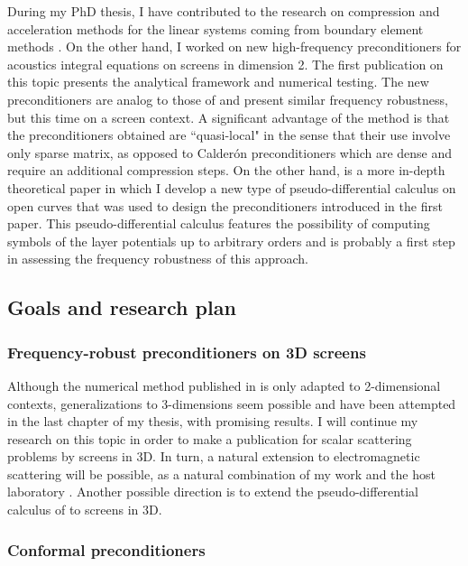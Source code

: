 \documentclass[]{article}
\begin{document}
During my PhD thesis, I have contributed to the research on compression and acceleration methods for the linear systems coming from boundary element methods \cite{averseng2017fast}. 
On the other hand, I worked on new high-frequency preconditioners for acoustics integral equations on screens in dimension 2. The first publication on this topic \cite{alouges2019new} presents the analytical framework and numerical testing. The new preconditioners are analog to those of \cite{antoine2007generalized} and present similar frequency robustness, but this time on a screen context. A significant advantage of the method is that the preconditioners obtained are ``quasi-local" in the sense that their use involve only sparse matrix, as opposed to Calder\'{o}n preconditioners which are dense and require an additional compression steps. On the other hand, \cite{averseng2019pseudo} is a more in-depth theoretical paper in which I develop a new type of pseudo-differential calculus on open curves that was used to design the preconditioners introduced in the first paper. This pseudo-differential calculus features the possibility of computing symbols of the layer potentials up to arbitrary orders and is probably a first step in assessing the frequency robustness of this approach. 



\subsection*{Goals and research plan}


\subsubsection*{Frequency-robust preconditioners on 3D screens}

Although the numerical method published in \cite{alouges2019new} is only adapted to 2-dimensional contexts, generalizations to 3-dimensions seem possible and have been attempted in the last chapter of my thesis, with promising results. I will continue my research on this topic in order to make a publication for scalar scattering problems by screens in 3D. In turn, a natural extension to electromagnetic scattering will be possible, as a natural combination of my work and the host laboratory \cite{hiptmair2019preconditioning}. Another possible direction is to extend the pseudo-differential calculus of \cite{averseng2019pseudo} to screens in 3D. 

\subsubsection*{Conformal preconditioners}
\end{document}

